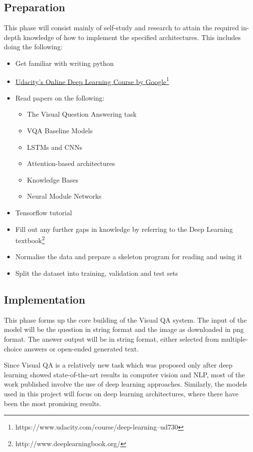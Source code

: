 \documentclass[12pt,a4paper,twoside]{article}
\begin{document}
\subsection{Preparation}
This phase will consist mainly of self-study and research to attain the required in-depth knowledge of how to implement the specified architectures. This includes doing the following:
\begin{itemize}
	\setlength\itemsep{0em}
	\item Get familiar with writing python
	\item \href{https://www.udacity.com/course/deep-learning--ud730}{Udacity's Online Deep Learning Course by Google}\footnote{https://www.udacity.com/course/deep-learning--ud730} 
	\item Read papers on the following:
	\begin{itemize}
		\setlength\itemsep{0em}
		\item The Visual Question Answering task
		\item VQA Baseline Models
		\item LSTMs and CNNs
		\item Attention-based architectures
		\item Knowledge Bases
		\item Neural Module Networks
	\end{itemize}
	\item Tensorflow tutorial
	\item Fill out any further gaps in knowledge by referring to the Deep Learning textbook\footnote{http://www.deeplearningbook.org/} 
	\item Normalise the data and prepare a skeleton program for reading and using it
	\item Split the dataset into training, validation and test sets
\end{itemize}

\subsection{Implementation}
This phase forms up the core building of the Visual QA system. The input of the model will be the question in string format and the image as downloaded in png format. The answer output will be in string format, either selected from multiple-choice answers or open-ended generated text.

Since Visual QA is a relatively new task which was proposed only after deep learning showed state-of-the-art results in computer vision and NLP, most of the work published involve the use of deep learning approaches. Similarly, the models used in this project will focus on deep learning architectures, where there have been the most promising results.
\end{document}
